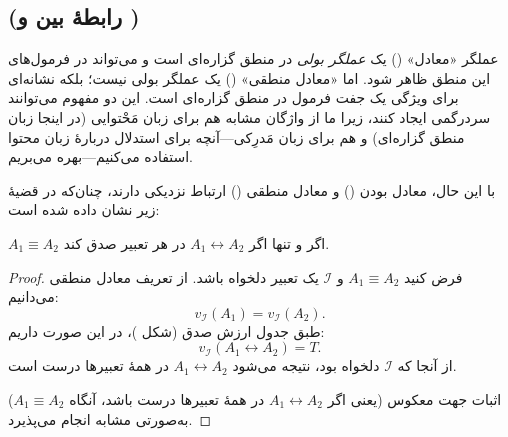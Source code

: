 \subsection*{ \quad (رابطهٔ بین \lr{$\leftrightarrow$} و \lr{$\equiv$})}
    عملگر «معادل» (\lr{$\leftrightarrow$}) یک \emph{عملگر بولی} در منطق گزاره‌ای است و می‌تواند در فرمول‌های این منطق ظاهر شود. اما «معادل منطقی» (\lr{$\equiv$}) یک عملگر بولی نیست؛ بلکه نشانه‌ای برای ویژگی یک جفت فرمول در منطق گزاره‌ای است. این دو مفهوم می‌توانند سردرگمی ایجاد کنند، زیرا ما از واژگان مشابه هم برای زبان مَحْتوایی (در اینجا زبان منطق گزاره‌ای) و هم برای زبان مَدرِکی—آنچه برای استدلال دربارهٔ زبان محتوا استفاده می‌کنیم—بهره می‌بریم.
    
    با این حال، معادل بودن (\lr{$\leftrightarrow$}) و معادل منطقی (\lr{$\equiv$}) ارتباط نزدیکی دارند، چنان‌که در قضیهٔ زیر نشان داده شده است:
    
    \begin{theorem}[قضیه \lr{2.29}]
      $A_1 \equiv A_2$ اگر و تنها اگر $A_1 \leftrightarrow A_2$ در هر تعبیر صدق کند.
    \end{theorem}
    
    \begin{proof}
      فرض کنید $A_1 \equiv A_2$ و $\mathscr{I}$ یک تعبیر دلخواه باشد. از تعریف معادل منطقی می‌دانیم:
      \[
      v_{\mathscr{I}}(A_1) = v_{\mathscr{I}}(A_2).
      \]
      طبق جدول ارزش صدق (شکل )، در این صورت داریم:
      \[
      v_{\mathscr{I}}(A_1 \leftrightarrow A_2) = T.
      \]
      از آنجا که $\mathscr{I}$ دلخواه بود، نتیجه می‌شود $A_1 \leftrightarrow A_2$ در همهٔ تعبیرها درست است.
      
      اثبات جهت معکوس (یعنی اگر $A_1 \leftrightarrow A_2$ در همهٔ تعبیرها درست باشد، آنگاه $A_1 \equiv A_2$) به‌صورتی مشابه انجام می‌پذیرد.
    \end{proof}
    
